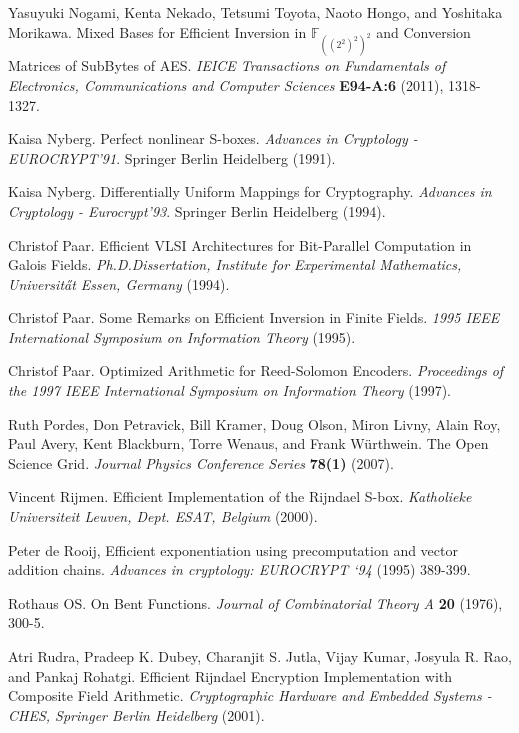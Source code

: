 \documentclass[11pt,american]{report}
\begin{document}
\begin{thebibliography}{9}
 Yasuyuki Nogami, Kenta Nekado, Tetsumi Toyota, Naoto Hongo, and Yoshitaka Morikawa. Mixed Bases for Efficient Inversion in $\mathbb{F}_{((2^2)^2)^2}$ and Conversion Matrices of SubBytes of AES. \emph{IEICE Transactions on Fundamentals of Electronics, Communications and Computer Sciences} \textbf{E94-A:6} (2011), 1318-1327.

 Kaisa Nyberg. Perfect nonlinear S-boxes. \emph{Advances in Cryptology - EUROCRYPT’91}. Springer Berlin Heidelberg (1991).

 Kaisa Nyberg. Differentially Uniform Mappings for Cryptography. \emph{Advances in Cryptology - Eurocrypt’93}. Springer Berlin Heidelberg (1994).



 Christof Paar. Efficient VLSI Architectures for Bit-Parallel Computation in Galois Fields. \emph{Ph.D.Dissertation, Institute for Experimental Mathematics, Universit\H{a}t Essen, Germany} (1994).

 Christof Paar. Some Remarks on Efficient Inversion in Finite Fields. \emph{1995 IEEE International Symposium on Information Theory} (1995).

 Christof Paar. Optimized Arithmetic for Reed-Solomon Encoders. \emph{Proceedings of the 1997 IEEE International Symposium on Information Theory} (1997).

 Ruth Pordes, Don Petravick, Bill Kramer, Doug Olson, Miron Livny, Alain Roy, Paul Avery, Kent Blackburn, Torre Wenaus, and Frank W\"{u}rthwein. The Open Science Grid. \emph{Journal Physics Conference Series} \textbf{78(1)} (2007).



 Vincent Rijmen. Efficient Implementation of the Rijndael S-box. \emph{Katholieke Universiteit Leuven, Dept. ESAT, Belgium} (2000).

 Peter de Rooij, Efficient exponentiation using precomputation and vector addition chains. \emph{Advances in cryptology: EUROCRYPT `94} (1995) 389-399. 

 Rothaus OS. On Bent Functions. \emph{Journal of Combinatorial Theory A} \textbf{20} (1976), 300-5.

 Atri Rudra, Pradeep K. Dubey, Charanjit S. Jutla, Vijay Kumar, Josyula R. Rao, and Pankaj Rohatgi. Efficient Rijndael Encryption Implementation with Composite Field Arithmetic. \emph{Cryptographic Hardware and Embedded Systems - CHES, Springer Berlin Heidelberg} (2001).


\end{thebibliography}
\end{document}
